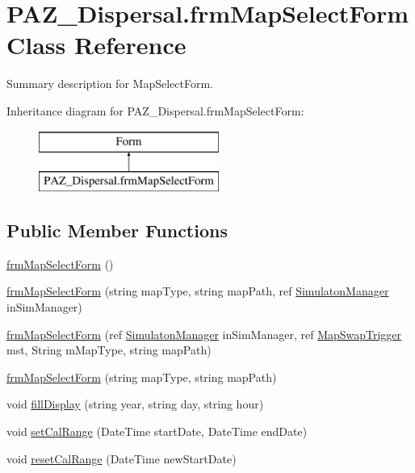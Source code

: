 \hypertarget{class_p_a_z___dispersal_1_1frm_map_select_form}{\section{P\-A\-Z\-\_\-\-Dispersal.\-frm\-Map\-Select\-Form Class Reference}
\label{class_p_a_z___dispersal_1_1frm_map_select_form}
}


Summary description for Map\-Select\-Form.  


Inheritance diagram for P\-A\-Z\-\_\-\-Dispersal.\-frm\-Map\-Select\-Form\-:\begin{figure}[H]
\begin{center}
\leavevmode
\includegraphics[height=2.000000cm]{class_p_a_z___dispersal_1_1frm_map_select_form}
\end{center}
\end{figure}
\subsection*{Public Member Functions}
\begin{DoxyCompactItemize}
\item 
\hyperlink{class_p_a_z___dispersal_1_1frm_map_select_form_a5a40396c28d781d6604610cf91252afc}{frm\-Map\-Select\-Form} ()
\item 
\hyperlink{class_p_a_z___dispersal_1_1frm_map_select_form_a7c7c81ce83392a12fc4edaf96fb57aa0}{frm\-Map\-Select\-Form} (string map\-Type, string map\-Path, ref \hyperlink{class_p_a_z___dispersal_1_1_simulaton_manager}{Simulaton\-Manager} in\-Sim\-Manager)
\item 
\hyperlink{class_p_a_z___dispersal_1_1frm_map_select_form_aaedb44caf5226daa174c60c6bce29eb4}{frm\-Map\-Select\-Form} (ref \hyperlink{class_p_a_z___dispersal_1_1_simulaton_manager}{Simulaton\-Manager} in\-Sim\-Manager, ref \hyperlink{class_p_a_z___dispersal_1_1_map_swap_trigger}{Map\-Swap\-Trigger} mst, String m\-Map\-Type, string map\-Path)
\item 
\hyperlink{class_p_a_z___dispersal_1_1frm_map_select_form_a10d3eb08270fc116f69f4a986dbe0fc2}{frm\-Map\-Select\-Form} (string map\-Type, string map\-Path)
\item 
void \hyperlink{class_p_a_z___dispersal_1_1frm_map_select_form_a5c4446be01f7ced098c61e1c3f669952}{fill\-Display} (string year, string day, string hour)
\item 
void \hyperlink{class_p_a_z___dispersal_1_1frm_map_select_form_a4e2da71a609ad2f0147707f99a488459}{set\-Cal\-Range} (Date\-Time start\-Date, Date\-Time end\-Date)
\item 
void \hyperlink{class_p_a_z___dispersal_1_1frm_map_select_form_a98abf206dea634a0bda808b3fe3367f6}{reset\-Cal\-Range} (Date\-Time new\-Start\-Date)
\end{DoxyCompactItemize}
